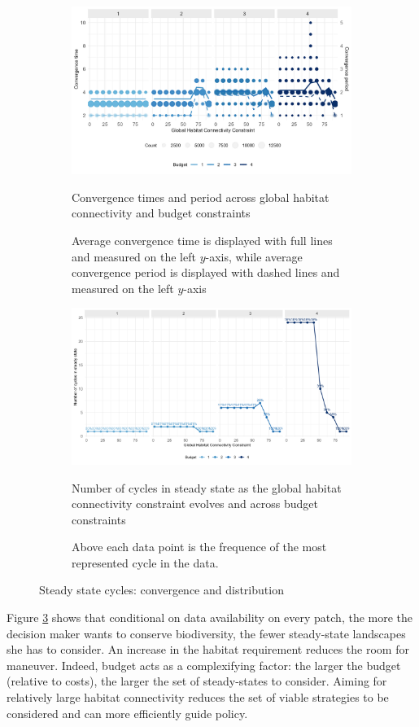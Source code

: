 \begin{figure}[H]
    \centering
    \begin{subfigure}[b]{\textwidth}
    \centering
    		\includegraphics[width = .8\textwidth]{figures/wildland/convergence_times.jpg}
    		\caption{Convergence times and period across global habitat connectivity and budget constraints}
    		\caption*{Average convergence time is displayed with full lines and measured on the left $y$-axis, while average convergence period is displayed with dashed lines and measured on the left $y$-axis} 
    		\label{fig:convergence_time}
	\end{subfigure}
	\begin{subfigure}[b]{\textwidth}
    		\centering
    		\includegraphics[width = .8\textwidth]{figures/wildland/number_of_cycles.jpg}
    		\caption{Number of cycles in steady state as the global habitat connectivity constraint evolves and across budget constraints}
    		\caption*{Above each data point is the frequence of the most represented cycle in the data.} 
    		\label{fig:distrib_cycles}
	\end{subfigure}
\caption{Steady state cycles: convergence and distribution}
\end{figure}
%
Figure \ref{fig:distrib_cycles} shows that conditional on data availability on every patch, the more the decision maker wants to conserve biodiversity, the fewer steady-state landscapes she has to consider. An increase in the habitat requirement reduces the room for maneuver. Indeed, budget acts as a complexifying factor: the larger the budget (relative to costs), the larger the set of steady-states to consider. 
Aiming for relatively large habitat connectivity reduces the set of viable strategies to be considered and can more efficiently guide policy. 
%


